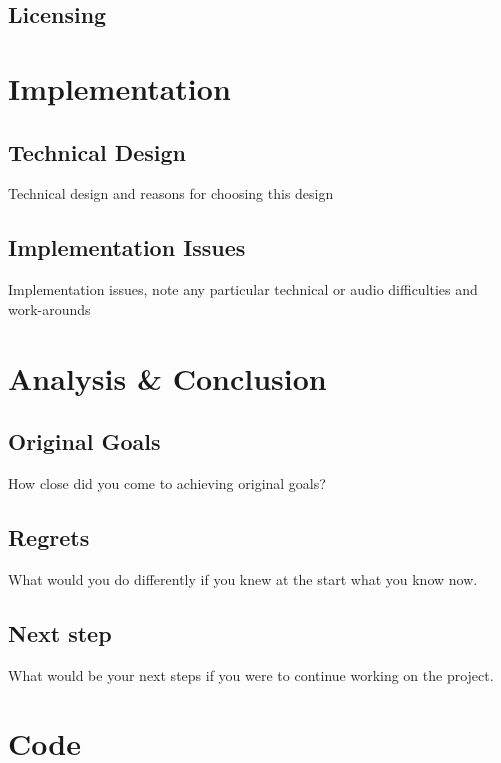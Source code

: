 \documentclass[12pt,a4paper]{article}
\begin{document}
\subsection{Licensing}


\section{Implementation}
\subsection{Technical Design}
Technical design and reasons for choosing this design
\subsection{Implementation Issues}
Implementation issues, note any particular technical or audio difficulties and work-arounds


\section{Analysis \& Conclusion}
\subsection{Original Goals}
How close did you come to achieving original goals?
\subsection{Regrets}
What would you do differently if you knew at the start what you know now. 
\subsection{Next step}
What would be your next steps if you were to continue working on the project.


\section{Code}
\end{document}
